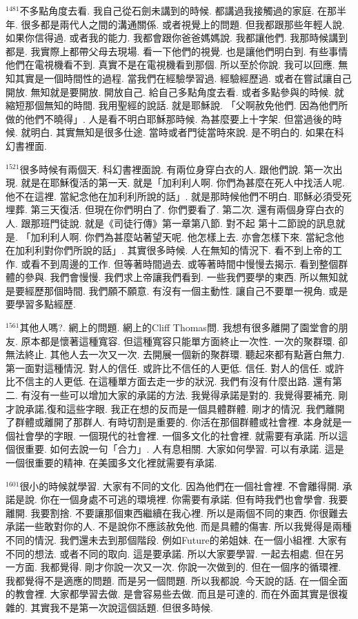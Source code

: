 \documentclass{book}
\begin{document}
$^{1481}$不多點角度去看.
我自己從石劍未講到的時候.
都講過我接觸過的家庭.
在那半年.
很多都是兩代人之間的溝通關係.
或者視覺上的問題.
但我都跟那些年輕人說.
如果你信得過.
或者我的能力.
我都會跟你爸爸媽媽說.
我都讓他們.
我那時候講到都是.
我實際上都帶父母去現場.
看一下他們的視覺.
也是讓他們明白到.
有些事情他們在電視機看不到.
真實不是在電視機看到那個.
所以至於你說.
我可以回應.
無知其實是一個時間性的過程.
當我們在經驗學習過.
經驗經歷過.
或者在嘗試讓自己開放.
無知就是要開放.
開放自己.
給自己多點角度去看.
或者多點參與的時候.
就縮短那個無知的時間.
我用聖經的說話.
就是耶穌說.
「父啊赦免他們.
因為他們所做的他們不曉得」.
人是看不明白耶穌那時候.
為甚麼要上十字架.
但當過後的時候.
就明白.
其實無知是很多仕途.
當時或者門徒當時來說.
是不明白的.
如果在科幻書裡面.

$^{1521}$很多時候有兩個天.
科幻書裡面說.
有兩位身穿白衣的人.
跟他們說.
第一次出現.
就是在耶穌復活的第一天.
就是「加利利人啊.
你們為甚麼在死人中找活人呢.
他不在這裡.
當紀念他在加利利所說的話」.
就是那時候他們不明白.
耶穌必須受死埋葬.
第三天復活.
但現在你們明白了.
你們要看了.
第二次.
還有兩個身穿白衣的人.
跟那班門徒說.
就是《司徒行傳》第一章第八節.
對不起 第十二節說的訊息就是.
「加利利人啊.
你們為甚麼站著望天呢.
他怎樣上去.
亦會怎樣下來.
當紀念他在加利利對你們所說的話」.
其實很多時候.
人在無知的情況下.
看不到上帝的工作.
或看不到周邊的工作.
但等著時間過去.
或等著時間中慢慢去揭示.
看到整個群體的參與.
我們會慢慢.
我們求上帝讓我們看到.
一些我們要學的東西.
所以無知就是要經歷那個時間.
我們願不願意.
有沒有一個主動性.
讓自己不要單一視角.
或是要學習多點經歷.

$^{1561}$其他人嗎?.
網上的問題.
網上的Cliff Thomas問.
我想有很多離開了園堂會的朋友.
原本都是懷著這種寬容.
但這種寬容只能單方面終止一次性.
一次的聚群環.
卻無法終止.
其他人去一次又一次.
去開展一個新的聚群環.
聽起來都有點蒼白無力.
第一面對這種情況.
對人的信任.
或許比不信任的人更低.
信任.
對人的信任.
或許比不信主的人更低.
在這種單方面去走一步的狀況.
我們有沒有什麼出路.
還有第二.
有沒有一些可以增加大家的承諾的方法.
我覺得承諾是對的.
我覺得要補充.
剛才說承諾,復和這些字眼.
我正在想的反而是一個具體群體.
剛才的情況.
我們離開了群體或離開了那群人.
有時切割是重要的.
你活在那個群體或社會裡.
本身就是一個社會學的字眼.
一個現代的社會裡.
一個多文化的社會裡.
就需要有承諾.
所以這個很重要.
如何去說一句「合力」.
人有息相關.
大家如何學習.
可以有承諾.
這是一個很重要的精神.
在美國多文化裡就需要有承諾.

$^{1601}$很小的時候就學習.
大家有不同的文化.
因為他們在一個社會裡.
不會離得開.
承諾是說.
你在一個身處不可逃的環境裡.
你需要有承諾.
但有時我們也會學會.
我要離開.
我要割捨.
不要讓那個東西繼續在我心裡.
所以是兩個不同的東西.
你很難去承諾一些敢對你的人.
不是說你不應該赦免他.
而是具體的傷害.
所以我覺得是兩種不同的情況.
我們還未去到那個階段.
例如Future的弟姐妹.
在一個小組裡.
大家有不同的想法.
或者不同的取向.
這是要承諾.
所以大家要學習.
一起去相處.
但在另一方面.
我都覺得.
剛才你說一次又一次.
你說一次做到的.
但在一個序的循環裡.
我都覺得不是適應的問題.
而是另一個問題.
所以我都說.
今天說的話.
在一個全面的教會裡.
大家都學習去做.
是會容易些去做.
而且是可達的.
而在外面其實是很複雜的.
其實我不是第一次說這個話題.
但很多時候.
\end{document}
